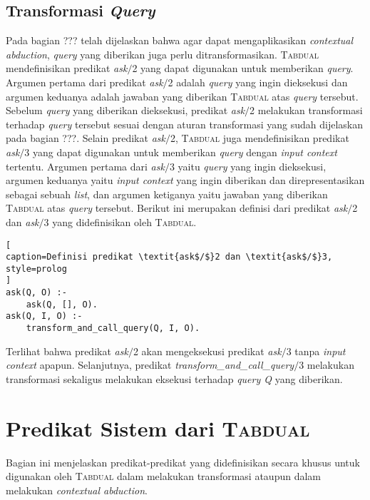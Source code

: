 \subsection{Transformasi \textit{Query}}

Pada bagian ??? telah dijelaskan bahwa agar dapat mengaplikasikan \textit{contextual abduction}, \textit{query} yang diberikan juga perlu ditransformasikan. \textsc{Tabdual} mendefinisikan predikat \textit{ask$/$}2 yang dapat digunakan untuk memberikan \textit{query}. Argumen pertama dari predikat \textit{ask$/$}2 adalah \textit{query} yang ingin dieksekusi dan argumen keduanya adalah jawaban yang diberikan \textsc{Tabdual} atas \textit{query} tersebut. Sebelum \textit{query} yang diberikan dieksekusi, predikat \textit{ask$/$}2 melakukan transformasi terhadap \textit{query} tersebut sesuai dengan aturan transformasi yang sudah dijelaskan pada bagian ???. Selain predikat \textit{ask$/$}2, \textsc{Tabdual} juga mendefinisikan predikat \textit{ask$/$}3 yang dapat digunakan untuk memberikan \textit{query} dengan \textit{input context} tertentu. Argumen pertama dari \textit{ask$/$}3 yaitu \textit{query} yang ingin dieksekusi, argumen keduanya yaitu \textit{input context} yang ingin diberikan dan direpresentasikan sebagai sebuah \textit{list}, dan argumen ketiganya yaitu jawaban yang diberikan \textsc{Tabdual} atas \textit{query} tersebut. Berikut ini merupakan definisi dari predikat \textit{ask$/$}2 dan \textit{ask$/$}3 yang didefinisikan oleh \textsc{Tabdual}.
\\

\begin{lstlisting}[
caption=Definisi predikat \textit{ask$/$}2 dan \textit{ask$/$}3,
style=prolog
]
ask(Q, O) :- 
	ask(Q, [], O).
ask(Q, I, O) :-
	transform_and_call_query(Q, I, O).
\end{lstlisting}

Terlihat bahwa predikat \textit{ask$/$}2 akan mengeksekusi predikat \textit{ask$/$}3 tanpa \textit{input context} apapun. Selanjutnya, predikat \textit{transform\_and\_call\_query$/$}3 melakukan transformasi sekaligus melakukan eksekusi terhadap \textit{query Q} yang diberikan.

 \section{Predikat Sistem dari \textsc{Tabdual}}

Bagian ini menjelaskan predikat-predikat yang didefinisikan secara khusus untuk digunakan oleh \textsc{Tabdual} dalam melakukan transformasi ataupun dalam melakukan \textit{contextual abduction}.

